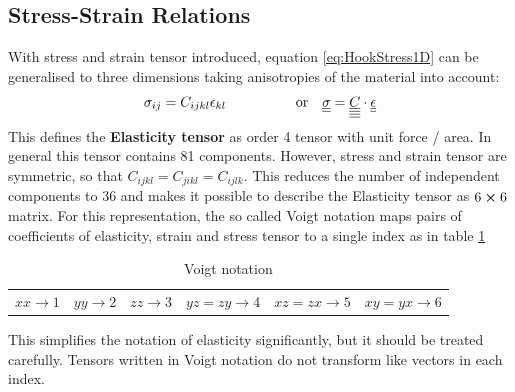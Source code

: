 \subsection{Stress-Strain Relations}
With stress and strain tensor introduced, equation \ref{eq:HookStress1D} can
be generalised to three dimensions taking anisotropies of the material into
account:
\begin{align} \label{eq:HookStress3D}
     & \sigma_{ij} =  C_{ijkl}\epsilon_{kl} \quad\quad\quad
    \quad \quad \text{or}
     & \underline{\underline{\sigma}} = \underline{\underline{\underline{\underline{C}}}} \cdot \underline{\underline{\epsilon}}
\end{align}
This defines the \textbf{Elasticity tensor} as order 4 tensor with unit force
/ area. In general this tensor contains 81 components. However, stress and
strain tensor are symmetric, so that $C_{ijkl} = C_{jikl} = C_{ijlk}$. This
reduces the number of independent components to 36 and makes it possible to
describe the Elasticity tensor as $6\cross6$ matrix. For this representation,
the so called Voigt notation maps pairs of coefficients of elasticity, strain
and stress tensor to a single index as in table \ref{tab:voigt}
\begin{table}[h]
    \centering
    \begin{tabular}{cccccc}
        $xx \rightarrow 1$ & $yy \rightarrow 2$    & $zz \rightarrow 3$    &
        $yz=zy
        \rightarrow 4$     & $xz=zx \rightarrow 5$ & $xy=yx \rightarrow 6$
    \end{tabular}
    \caption{Voigt notation}
    \label{tab:voigt}
\end{table}
This simplifies the notation of elasticity significantly, but it should be
treated carefully. Tensors written in Voigt notation do not transform like
vectors in each index.

